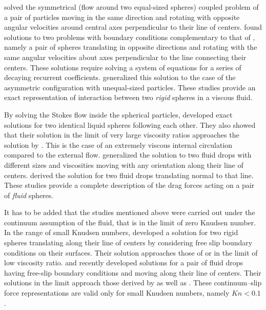 \documentclass[../thesis.tex]{subfiles}
\begin{document}
\cite{GCB66} solved the symmetrical (flow around two equal-sized spheres) coupled problem of a pair of particles moving in the same direction and rotating with opposite angular velocities around central axes perpendicular to their line of centers. \cite{ON69} found solutions to two problems with boundary conditions complementary to that of \cite{GCB66}, namely a pair of spheres translating in opposite directions and rotating with the same angular velocities about axes perpendicular to the line connecting their centers. These solutions require solving a system of equations for a series of decaying recurrent coefficients. \cite{ONM70} generalized this solution to the case of the asymmetric configuration with unequal-sized particles. These studies provide an exact representation of interaction between two \textit{rigid} spheres in a viscous fluid. 

By solving the Stokes flow inside the spherical particles, \cite{WW72} developed exact solutions for two identical liquid spheres following each other. They also showed that their solution in the limit of very large viscosity ratios approaches the  solution by \cite{SJ26}. This is the case of an extremely viscous internal circulation compared to the external flow. \cite{HHS73} generalized the solution to two fluid drops with different sizes and viscosities moving with any orientation along their line of centers. \cite{Z80} derived the solution for two fluid drops translating normal to that line. These studies provide a complete description of the drag forces acting on a pair of \textit{fluid} spheres.

It has to be added that the studies mentioned above were carried out under the continuum assumption of the fluid, that is in the limit of zero Knudsen number. In the range of small Knudsen numbers, \cite{RM74} developed a solution for two rigid spheres translating along their line of centers by considering free slip boundary conditions on their surfaces. Their solution approaches those of \cite{WW72} or \cite{HHS73} in the limit of low viscosity ratio. \cite{G96} and recently \cite{RSD22} developed solutions for a pair of fluid drops having free-slip boundary conditions and moving along their line of centers. Their solutions in the limit approach those derived by \cite{RM74} as well as \cite{HHS73}. These continuum--slip force representations are valid only for small Knudsen numbers, namely $Kn < 0.1$.
\end{document}
